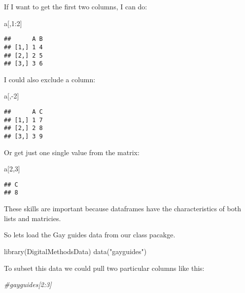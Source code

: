 \documentclass[
]{article}
\newenvironment{Shaded}{\begin{snugshade}}{\end{snugshade}}
\newcommand{\CommentTok}[1]{\textcolor[rgb]{0.56,0.35,0.01}{\textit{#1}}}
\newcommand{\DecValTok}[1]{\textcolor[rgb]{0.00,0.00,0.81}{#1}}
\newcommand{\FunctionTok}[1]{\textcolor[rgb]{0.00,0.00,0.00}{#1}}
\newcommand{\NormalTok}[1]{#1}
\newcommand{\SpecialCharTok}[1]{\textcolor[rgb]{0.00,0.00,0.00}{#1}}
\newcommand{\StringTok}[1]{\textcolor[rgb]{0.31,0.60,0.02}{#1}}
\begin{document}
If I want to get the first two columns, I can do:

\begin{Shaded}
\begin{Highlighting}[]
\NormalTok{a[,}\DecValTok{1}\SpecialCharTok{:}\DecValTok{2}\NormalTok{]}
\end{Highlighting}
\end{Shaded}

\begin{verbatim}
##      A B
## [1,] 1 4
## [2,] 2 5
## [3,] 3 6
\end{verbatim}

I could also exclude a column:

\begin{Shaded}
\begin{Highlighting}[]
\NormalTok{a[,}\SpecialCharTok{{-}}\DecValTok{2}\NormalTok{]}
\end{Highlighting}
\end{Shaded}

\begin{verbatim}
##      A C
## [1,] 1 7
## [2,] 2 8
## [3,] 3 9
\end{verbatim}

Or get just one single value from the matrix:

\begin{Shaded}
\begin{Highlighting}[]
\NormalTok{a[}\DecValTok{2}\NormalTok{,}\DecValTok{3}\NormalTok{]}
\end{Highlighting}
\end{Shaded}

\begin{verbatim}
## C 
## 8
\end{verbatim}

These skills are important because dataframes have the characteristics
of both lists and matricies.

So lets load the Gay guides data from our class pacakge.

\begin{Shaded}
\begin{Highlighting}[]
\FunctionTok{library}\NormalTok{(DigitalMethodsData)}
\FunctionTok{data}\NormalTok{(}\StringTok{"gayguides"}\NormalTok{)}
\end{Highlighting}
\end{Shaded}

To subset this data we could pull two particular columns like this:

\begin{Shaded}
\begin{Highlighting}[]
\CommentTok{\#gayguides[2:3]}
\end{Highlighting}
\end{Shaded}
\end{document}
